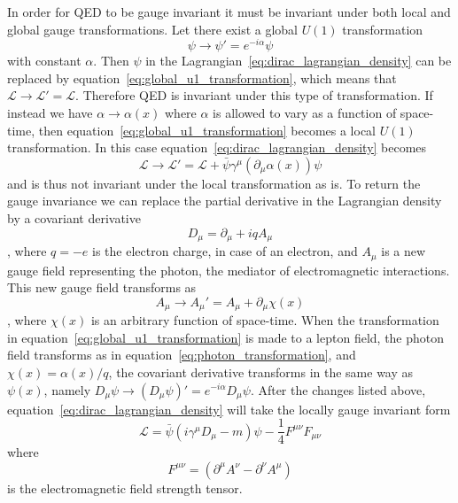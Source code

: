 In order for QED to be gauge invariant it must be invariant under both local and global gauge transformations.
Let there exist a global $U\left(1\right)$ transformation
\begin{equation}\label{eq:global_u1_transformation}
	\psi\rightarrow\psi'=e^{-i\alpha}\psi
\end{equation}
with constant $\alpha$.
Then $\psi$ in the Lagrangian~\ref{eq:dirac_lagrangian_density} can be replaced by equation~\ref{eq:global_u1_transformation}, which means that $\mathcal{L}\rightarrow\mathcal{L}'=\mathcal{L}$.
Therefore QED is invariant under this type of transformation.
If instead we have $\alpha\rightarrow\alpha\left(x\right)$ where $\alpha$ is allowed to vary as a function of space-time, then equation~\ref{eq:global_u1_transformation} becomes a local $U\left(1\right)$ transformation.
In this case equation~\ref{eq:dirac_lagrangian_density} becomes
\begin{equation}\label{eq:local_transformation}
	\mathcal{L}\rightarrow\mathcal{L}'=\mathcal{L}+\bar{\psi}\gamma^{\mu}\left(\partial_{\mu}\alpha\left(x\right)\right)\psi
\end{equation}
and is thus not invariant under the local transformation as is.
To return the gauge invariance we can replace the partial derivative in the Lagrangian density by a covariant derivative
\begin{equation}\label{eq:covariant_derivative}
	D_{\mu}=\partial_{\mu}+iqA_{\mu}
\end{equation}
, where $q=-e$ is the electron charge, in case of an electron, and $A_{\mu}$ is a new gauge field representing the photon, the mediator of electromagnetic interactions.
This new gauge field transforms as
\begin{equation}\label{eq:photon_transformation}
	A_{\mu}{\rightarrow}A_{\mu}'=A_{\mu}+\partial_{\mu}\chi\left(x\right)
\end{equation}
, where $\chi\left(x\right)$ is an arbitrary function of space-time.
When the transformation in equation~\ref{eq:global_u1_transformation} is made to a lepton field, the photon field transforms as in equation~\ref{eq:photon_transformation}, and $\chi\left(x\right)=\alpha\left(x\right)/q$, the covariant derivative transforms in the same way as $\psi\left(x\right)$, namely $D_{\mu}\psi\rightarrow\left(D_{\mu}\psi\right)'=e^{-i\alpha}D_{\mu}\psi$.
After the changes listed above, equation~\ref{eq:dirac_lagrangian_density} will take the locally gauge invariant form
\begin{equation}\label{eq:dirac_lagrangian_density_local_invariant}
	\mathcal{L}=\bar{\psi}\left(i\gamma^{\mu}D_{\mu}-m\right)\psi-\frac{1}{4}F^{\mu\nu}F_{\mu\nu}
\end{equation}
where
\begin{equation}\label{eq:electromagnetic_field_strength_tensor}
	F^{\mu\nu}=\left(\partial^{\mu}A^{\nu}-\partial^{\nu}A^{\mu}\right)
\end{equation}
is the electromagnetic field strength tensor.

